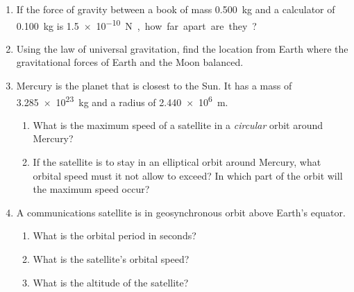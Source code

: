 \begin{enumerate}[itemsep=6pt]
%

\item If the force of gravity between a book of mass
  \SI{.500}{\kilo\gram} and a calculator of \SI{.100}{\kilo\gram} is
  \SI{1.5e-10}\newton, how far apart are they? 

\item Using the law of universal gravitation, find the location from Earth
  where the gravitational forces of Earth and the Moon balanced.


\item Mercury is the planet that is closest to the Sun. It has a mass of
  \SI{3.285e23}{\kilo\gram} and a radius of \SI{2.440e6}\metre.
  \begin{enumerate}[itemsep=3pt]
  \item What is the maximum speed of a satellite in a \emph{circular} orbit
    around Mercury?
  \item If the satellite is to stay in an elliptical orbit around Mercury,
    what orbital speed must it not allow to exceed? In which part of the orbit
    will the maximum speed occur?
  \end{enumerate}

\item A communications satellite is in geosynchronous orbit above Earth's
  equator.
  \begin{enumerate}[itemsep=3pt]
  \item What is the orbital period in seconds?
  \item What is the satellite's orbital speed?
  \item What is the altitude of the satellite?
  \end{enumerate}


\end{enumerate}
